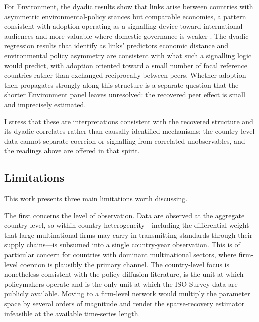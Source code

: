 \documentclass[12pt,a4paper]{article}
\begin{document}
For Environment, the dyadic results show that links arise between countries with asymmetric environmental-policy stances but comparable economies, a pattern consistent with adoption operating as a signalling device toward international audiences and more valuable where domestic governance is weaker \citep{berliner2013}. The dyadic regression results that identify as links' predictors economic distance and environmental policy asymmetry are consistent with what such a signalling logic would predict, with adoption oriented toward a small number of focal reference countries rather than exchanged reciprocally between peers. Whether adoption then propagates strongly along this structure is a separate question that the shorter Environment panel leaves unresolved: the recovered peer effect is small and imprecisely estimated.

I stress that these are interpretations consistent with the recovered structure and its dyadic correlates rather than causally identified mechanisms; the country-level data cannot separate coercion or signalling from correlated unobservables, and the readings above are offered in that spirit.

\subsection{Limitations}
\label{sec:limitations}


This work presents three main limitations worth discussing.

The first concerns the level of observation. Data are observed at the aggregate country level, so within-country heterogeneity---including the differential weight that large multinational firms may carry in transmitting standards through their supply chains---is subsumed into a single country-year observation. This is of particular concern for countries with dominant multinational sectors, where firm-level coercion is plausibly the primary channel. The country-level focus is nonetheless consistent with the policy diffusion literature, is the unit at which policymakers operate and is the only unit at which the ISO Survey data are publicly available. Moving to a firm-level network would multiply the parameter space by several orders of magnitude and render the sparse-recovery estimator infeasible at the available time-series length.
\end{document}
